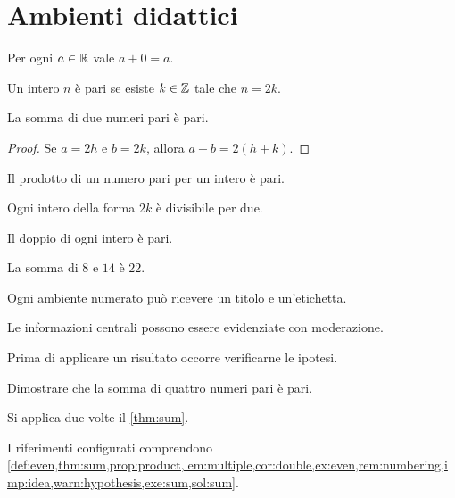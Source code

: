 \documentclass{../../../unipd-notes}
\begin{document}
\chapter{Ambienti didattici}

\begin{axiom}\label{ass:zero}
Per ogni $a\in\mathbb{R}$ vale $a+0=a$.
\end{axiom}

\begin{definition}\label{def:even}
Un intero $n$ è pari se esiste $k\in\mathbb{Z}$ tale che $n=2k$.
\end{definition}

\begin{theorem}\label{thm:sum}
La somma di due numeri pari è pari.
\end{theorem}

\begin{proof}
Se $a=2h$ e $b=2k$, allora $a+b=2(h+k)$.
\end{proof}

\begin{proposition}\label{prop:product}
Il prodotto di un numero pari per un intero è pari.
\end{proposition}

\begin{lemma}\label{lem:multiple}
Ogni intero della forma $2k$ è divisibile per due.
\end{lemma}

\begin{corollary}\label{cor:double}
Il doppio di ogni intero è pari.
\end{corollary}

\begin{example}\label{ex:even}
La somma di $8$ e $14$ è $22$.
\end{example}

\begin{remark}\label{rem:numbering}
Ogni ambiente numerato può ricevere un titolo e un'etichetta.
\end{remark}

\begin{important}\label{imp:idea}
Le informazioni centrali possono essere evidenziate con moderazione.
\end{important}

\begin{warning}\label{warn:hypothesis}
Prima di applicare un risultato occorre verificarne le ipotesi.
\end{warning}

\begin{exercise}\label{exe:sum}
Dimostrare che la somma di quattro numeri pari è pari.
\end{exercise}

\begin{solution}\label{sol:sum}
Si applica due volte il \cref{thm:sum}.
\end{solution}

I riferimenti configurati comprendono \cref{def:even,thm:sum,prop:product,lem:multiple,cor:double,ex:even,rem:numbering,imp:idea,warn:hypothesis,exe:sum,sol:sum}.
\end{document}
